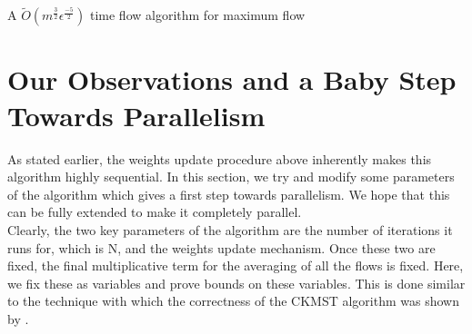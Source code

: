 \documentclass[BTech]{iitmdiss}
\begin{document}
	      \begin{algorithm}[H]
	        \caption{A $\widetilde{O}(m^{\frac{3}{2}}\epsilon^{\frac{-5}{2}})$ time flow algorithm for maximum flow}
	      \end{algorithm}
	    
	\section{Our Observations and a Baby Step Towards Parallelism}
	  As stated earlier, the weights update procedure above inherently makes this algorithm highly sequential. In this section, we try and modify 
	  some parameters of the algorithm which gives a first step towards parallelism. We hope that this can be fully extended to make it completely
	  parallel. \\
	  
	  Clearly, the two key parameters of the algorithm are the number of iterations it runs for, which is N, and the weights update mechanism.
	  Once these two are fixed, the final multiplicative term for the averaging of all the flows is fixed. Here, we fix these as variables and prove bounds 
	  on these variables. This is done similar to the technique with which the correctness of the CKMST algorithm was shown by \cite{DBLP:journals/corr/abs-1010-2921}. \\
	  
\end{document}
